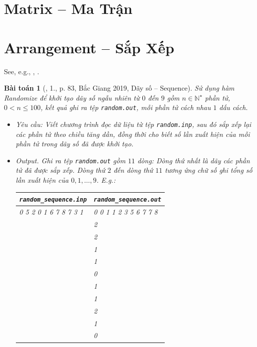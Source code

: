 \documentclass{article}
\newtheorem{baitoan}{Bài toán}
\begin{document}

\section{Matrix -- Ma Trận}


\section{Arrangement -- Sắp Xếp}
See, e.g., \cite[Chap. 5: Sorting]{Knuth1998}, \cite[Chap. II, Sect. Dạng bài sắp xếp]{VietSTEM2021}.

\begin{baitoan}[\cite{VietSTEM2021}, 1., p. 83, Bắc Giang 2019, Dãy số -- Sequence]
	Sử dụng hàm Randomize để khởi tạo dãy số ngẫu nhiên từ $0$ đến $9$ gồm $n\in\mathbb{N}^\star$ phần tử, $0 < n\le100$, kết quả ghi ra tệp \verb|random.out|, mỗi phần tử cách nhau $1$ dấu cách.
	\begin{itemize}
		\item {\sf Yêu cầu:} Viết chương trình đọc dữ liệu từ tệp \verb|random.inp|, sau đó sắp xếp lại các phần tử theo chiều tăng dần, đồng thời cho biết số lần xuất hiện của mỗi phần tử trong dãy số đã được khởi tạo.
		\item {\sf Output.} Ghi ra tệp \verb|random.out| gồm $11$ dòng: Dòng thứ nhất là dãy các phần tử đã được sắp xếp. Dòng thứ $2$ đến dòng thứ $11$ tương ứng chữ số ghi tổng số lần xuất hiện của $0,1,\ldots,9$. E.g.:
		\begin{table}[H]
			\centering
			\begin{tabular}{|l|l|}
				\hline
				\verb|random_sequence.inp| & \verb|random_sequence.out| \\
				\hline
				0 5 2 0 1 6 7 8 7 3 1 & 0 0 1 1 2 3 5 6 7 7 8 \\
				& 2 \\
				& 2 \\
				& 1 \\
				& 1 \\
				& 0 \\
				& 1 \\
				& 1 \\
				& 2 \\
				& 1 \\
				& 0 \\
				\hline
			\end{tabular}
		\end{table}
	\end{itemize}
\end{baitoan}
\end{document}
